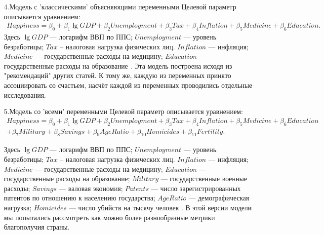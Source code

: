 \documentclass[aspectratio=169]{beamer}
\begin{document}
\begin{frame}{4.Модель с ’классическими’ объясняющими переменными}
   Целевой параметр описывается уравнением:
   \footnotesize{
        \begin{align*}
         Happiness = \beta_0 + \beta_1 \lg{GDP} + \beta_2 Unemployment + \beta_3 Tax + \beta_4 Inflation + \beta_5 Medicine + \beta_6 Education.
        \end{align*}
        }
    \normalsize
    Здесь $\lg{GDP}$ --- логарифм ВВП по ППС; $Unemployment $ --- уровень безработицы; $Tax $ -- налоговая нагрузка физических лиц. $Inflation $ --- инфляция; $Medicine $ --- государственные расходы на медицину; $Education $ --- государственные расходы на образование .
\hfill \break
\hfill \break
    Эта модель построена исходя из "рекомендаций" других статей. К тому же, каждую из переменных принято ассоциировать со счастьем, насчёт каждой из переменных проводились отдельные исследования.

\end{frame}

\begin{frame}{5.Модель со ’всеми’ переменными}
   Целевой параметр описывается уравнением:
   \footnotesize
        \begin{align*}
        Happiness = \beta_0 + \beta_1 \lg{GDP} + \beta_2 Unemployment + \beta_3 Tax + \beta_4 Inflation + \beta_5 Medicine + \beta_6 Education \\
            + \beta_7 Military + \beta_8 Savings + \beta_{9} AgeRatio + \beta_{10} Homicides + \beta_{11} Fertility.
        \end{align*}
    \normalsize

    Здесь $\lg{GDP}$ --- логарифм ВВП по ППС; $Unemployment$ --- уровень безработицы; $Tax$ -- налоговая нагрузка физических лиц. $Inflation$ --- инфляция; $Medicine$ --- государственные расходы на медицину; $Education$ --- государственные расходы на образование; $Military$ --- государственные военные расходы; $Savings$ --- валовая экономия; $Patents$ --- число зарегистрированных патентов по отношению к населению государства; $AgeRatio$ --- демографическая нагрузка; $Homicides$ --- число убийств на тысячу человек .
\hfill \break
\hfill \break
    В этой версии модели мы попытались рассмотреть как можно более разнообразные метрики благополучия страны.

\end{frame}
\end{document}
